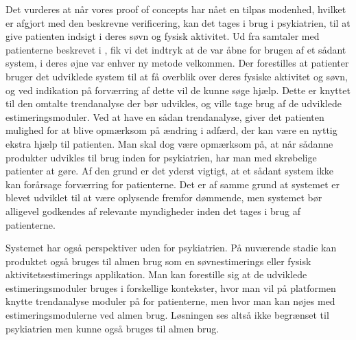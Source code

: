 Det vurderes at når vores proof of concepts har nået en tilpas modenhed, hvilket er afgjort med den beskrevne verificering, kan det tages i brug i psykiatrien, til at give patienten indsigt i deres søvn og fysisk aktivitet. 
Ud fra samtaler med patienterne beskrevet i \citet[Sektion 1.5]{misc:faellesrapp}, fik vi det indtryk at de var åbne for brugen af et sådant system, i deres øjne var enhver ny metode velkommen.
Der forestilles at patienter bruger det udviklede system til at få overblik over deres fysiske aktivitet og søvn, og ved indikation på forværring af dette vil de kunne søge hjælp. 
Dette er knyttet til den omtalte trendanalyse der bør udvikles, og ville tage brug af de udviklede estimeringsmoduler.
Ved at have en sådan trendanalyse, giver det patienten mulighed for at blive opmærksom på ændring i adfærd, der kan være en nyttig ekstra hjælp til patienten.
Man skal dog være opmærksom på, at når sådanne produkter udvikles til brug inden for psykiatrien, har man med skrøbelige patienter at gøre.
Af den grund er det yderst vigtigt, at et sådant system ikke kan forårsage forværring for patienterne.
Det er af samme grund at systemet er blevet udviklet til at være oplysende fremfor dømmende, men systemet bør alligevel godkendes af relevante myndigheder inden det tages i brug af patienterne.

Systemet har også perspektiver uden for psykiatrien.
På nuværende stadie kan produktet også bruges til almen brug som en søvnestimerings eller fysisk aktivitetsestimerings applikation.
Man kan forestille sig at de udviklede estimeringsmoduler bruges i forskellige kontekster, hvor man vil på platformen knytte trendanalyse moduler på for patienterne, men hvor man kan nøjes med estimeringsmodulerne ved almen brug.
Løsningen ses altså ikke begrænset til psykiatrien men kunne også bruges til almen brug.

